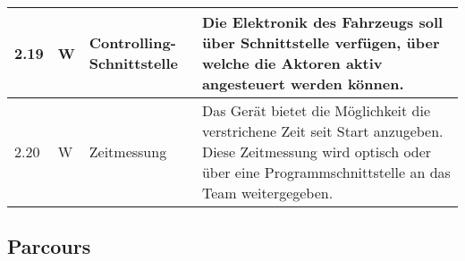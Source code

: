 \documentclass[main.tex]{subfiles} %
\begin{document}
\begin{tabular}{|l|p{0.5cm}|p{4cm}|p{10cm}|}
  \hline
  2.19         & W          & Controlling-Schnittstelle & Die Elektronik des Fahrzeugs soll über Schnittstelle verfügen, über welche die Aktoren aktiv angesteuert werden können.                                                                                                     \\
  \hline
  2.20         & W          & Zeitmessung               & Das Gerät bietet die Möglichkeit die verstrichene Zeit seit Start anzugeben. Diese Zeitmessung wird optisch oder über eine Programmschnittstelle an das Team weitergegeben.                                                 \\
  \hline
\end{tabular}

\subsection{Parcours}
\end{document}
